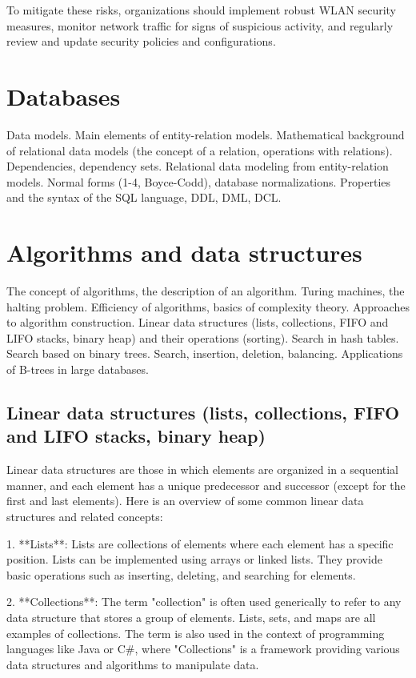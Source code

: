 \documentclass{article}
\begin{document}
To mitigate these risks, organizations should implement robust WLAN security measures, monitor network traffic for signs of suspicious activity, and regularly review and update security policies and configurations.


\section{Databases}

Data models. Main elements of entity-relation models. Mathematical background of relational data models (the concept of a relation, operations with relations). Dependencies, dependency sets. Relational data modeling from entity-relation models. Normal forms (1-4, Boyce-Codd), database normalizations. Properties and the syntax of the SQL language, DDL, DML, DCL.


\section{Algorithms and data structures}

The concept of algorithms, the description of an algorithm. Turing machines, the halting problem. Efficiency of algorithms, basics of complexity theory. Approaches to algorithm construction. Linear data structures (lists, collections, FIFO and LIFO stacks, binary heap) and their operations (sorting). Search in hash tables. Search based on binary trees. Search, insertion, deletion, balancing. Applications of B-trees in large databases.


\subsection{Linear data structures (lists, collections, FIFO and LIFO stacks, binary heap)}

Linear data structures are those in which elements are organized in a sequential manner, and each element has a unique predecessor and successor (except for the first and last elements). Here is an overview of some common linear data structures and related concepts:

1. **Lists**: Lists are collections of elements where each element has a specific position. Lists can be implemented using arrays or linked lists. They provide basic operations such as inserting, deleting, and searching for elements.

2. **Collections**: The term "collection" is often used generically to refer to any data structure that stores a group of elements. Lists, sets, and maps are all examples of collections. The term is also used in the context of programming languages like Java or C#, where "Collections" is a framework providing various data structures and algorithms to manipulate data.
\end{document}
